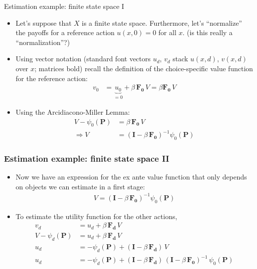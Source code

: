 \documentclass[aspectratio=169,11pt]{beamer}
\begin{document}
\begin{frame}{Estimation example: finite state space I}
\begin{itemize}
\item Let's suppose that $X$ is a finite state space. Furthermore, let's ``normalize'' the
	payoffs for
	 a reference action $u(x,0)=0$ for all $x$. (is this really a ``normalization''?)
	\item Using vector notation (standard font vectors $u_d$, $v_d$ stack $u(x,d)$, $v(x,d)$ over $x$; matrices bold) recall the definition of the choice-specific value function
	for the reference action:
\begin{align*}
v_{0} & = \underbrace{u_{0}}_{=0}+ \beta\, \symbf{F_{0}}\, V = \beta \symbf{F_{0}}\, V
\end{align*}
\item Using the Arcidiacono-Miller Lemma:
\medskip
\begin{align*}
V-\psi_{0}\left(\symbf{P}\right) & =  \beta\, \symbf{ F_{0}} \, V\\
\Rightarrow  V & =  \left(\symbf{I}-\beta\, \symbf{F_{0}} \right)^{-1} \psi_{0} \left(\symbf{P}\right)
\end{align*}
\end{itemize}
\end{frame}


\begin{frame}
\frametitle{Estimation example: finite state space II}
\begin{itemize}
	\item Now we have an expression for the ex ante value function
	that only depends on objects we can estimate in a first stage:
\begin{align*}
V  =  \left(\symbf{I}-\beta\, \symbf{F_{0}}\right)^{-1}\psi_{0}\left(\symbf{P}\right)
\end{align*}
\item To estimate the utility function for the other actions,
\begin{align*}
v_{d} & =  u_{d}+\beta\, \symbf{F_{d}} \, V\\
V-\psi_{d}\left(\symbf{P}\right) & =  u_{d}+\beta\,  \symbf{F_{d}} \, V\\
u_{d} & =  -\psi_{d}\left(\symbf{P}\right)+\left(\symbf{I}-\beta\,  \symbf{F_{d}} \right)\,V\\
u_{d} & =  -\psi_{d}\left(\symbf{P}\right)+\left(\symbf{I}-\beta\,   \symbf{F_{d}} \right)\, \left(\symbf{I}-\beta\,  \symbf{F_{0}} \right)^{-1} \,\psi_{0}\left(\symbf{P}\right)
\end{align*}
\end{itemize}
\end{frame}
\end{document}
